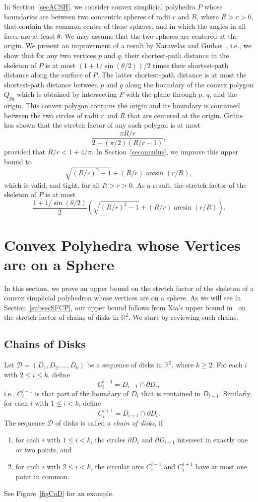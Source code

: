 \documentclass[12pt]{article}
\newcommand{\IR}{\mathbb{R}}
\begin{document}
In Section~\ref{secACSH}, we consider convex simplicial polyhedra $P$ 
whose boundaries are between two concentric spheres of radii $r$ and 
$R$, where $R>r>0$, that contain the common center of these spheres, 
and in which the angles in all faces are at least $\theta$. 
We may assume that the two spheres are centered at the origin. We 
present an improvement of a result by 
Karavelas and Guibas~\cite{kg-skgsa-01}, i.e., we show that for any two 
vertices $p$ and $q$, their shortest-path distance in the skeleton of 
$P$ is at most $(1 + 1/\sin(\theta/2))/2$ times their shortest-path 
distance along the surface of $P$. The latter shortest-path distance is 
at most the shortest-path distance between $p$ and $q$ along the 
boundary of the convex polygon $Q_{pq}$ which is obtained by 
intersecting $P$ with the plane through $p$, $q$, and the origin. This 
convex polygon contains the origin and its boundary is contained 
between the two circles of radii $r$ and $R$ that are centered at the 
origin. Gr{\"u}ne~\cite[Lemma~2.40]{g-gdhd-06} has 
shown that the stretch factor of any such polygon is at most 
\[ \frac{\pi R/r}{2 - (\pi/2) (R/r-1)} ,  
\] 
provided that $R/r < 1 + 4/\pi$. In Section~\ref{secannulus}, we improve 
this upper bound to 
\[ \sqrt{(R/r)^2-1} + (R/r) \arcsin(r/R) , 
\]
which is valid, and tight, for all $R>r>0$. As a result, the stretch 
factor of the skeleton of $P$ is at most 
\[ \frac{1 + 1/\sin(\theta/2)}{2}   
   \left( \sqrt{(R/r)^2-1} + (R/r) \arcsin(r/R) \right) .
\] 


\section{Convex Polyhedra whose Vertices are on a Sphere}  
\label{seconsphere} 
In this section, we prove an upper bound on the stretch factor of the 
skeleton of a convex simplicial polyhedron whose vertices are on a 
sphere. As we will see in Section~\ref{subsecSFCP}, our 
upper bound follows from Xia's upper bound in~\cite{x-sfdtl-13} on the 
stretch factor of chains of disks in $\IR^2$. We start by reviewing 
such chains. 

\subsection{Chains of Disks} \label{secCoD}
Let $\mathcal{D} = (D_1,D_2,\ldots,D_k)$ be a sequence of disks in 
$\IR^2$, where $k \geq 2$. For each $i$ with $2 \leq i \leq k$, define
\[ C_i^{i-1} = D_{i-1} \cap \partial D_i ,
\]
i.e., $C_i^{i-1}$ is that part of the boundary of $D_i$ that is contained 
in $D_{i-1}$. Similarly, for each $i$ with $1 \leq i < k$, define 
\[ C_i^{i+1} = D_{i+1} \cap \partial D_i .
\] 
The sequence $\mathcal{D}$ of disks is called a \emph{chain of disks}, 
if  
\begin{enumerate} 
\item for each $i$ with $1 \leq i < k$, the circles $\partial D_i$ and 
      $\partial D_{i+1}$ intersect in exactly one or two points, and  
\item for each $i$ with $2 \leq i < k$, the circular arcs $C_i^{i-1}$ 
      and $C_i^{i+1}$ have at most one point in common. 
\end{enumerate} 
See Figure~\ref{figCoD} for an example. 
\end{document}
